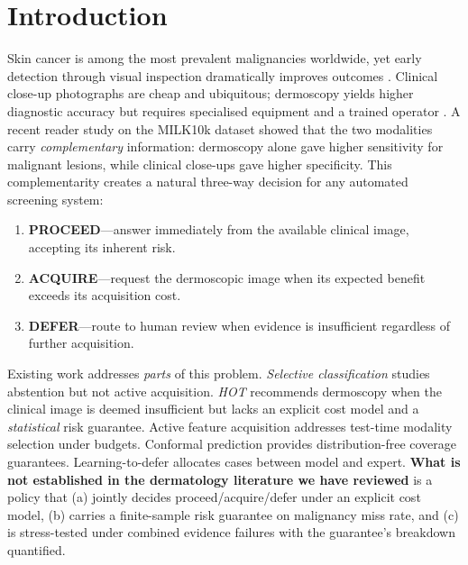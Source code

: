 \documentclass[conference]{IEEEtran}
\newcommand{\1}{\mathbf{1}}
\begin{document}
\section{Introduction}
\label{sec:introduction}

Skin cancer is among the most prevalent malignancies worldwide, yet early
detection through visual inspection dramatically improves outcomes
\cite{tschandl2018ham10000}. Clinical close-up photographs are cheap and
ubiquitous; dermoscopy yields higher diagnostic accuracy but requires
specialised equipment and a trained operator \cite{muller2026complementary}.
A recent reader study on the MILK10k dataset \cite{tschandl2024milk10k}
showed that the two modalities carry \emph{complementary} information:
dermoscopy alone gave higher sensitivity for malignant lesions, while
clinical close-ups gave higher specificity. This complementarity creates a
natural three-way decision for any automated screening system:

\begin{enumerate}[leftmargin=*, label=(\arabic*)]
  \item \textbf{PROCEED}---answer immediately from the available clinical
        image, accepting its inherent risk.
  \item \textbf{ACQUIRE}---request the dermoscopic image when its expected
        benefit exceeds its acquisition cost.
  \item \textbf{DEFER}---route to human review when evidence is
        insufficient regardless of further acquisition.
\end{enumerate}

Existing work addresses \emph{parts} of this problem.
\textit{Selective classification} \cite{geifman2017selective} studies
abstention but not active acquisition. \textit{HOT} \cite{mehta2023hot}
recommends dermoscopy when the clinical image is deemed insufficient but
lacks an explicit cost model and a \emph{statistical} risk guarantee.
Active feature acquisition \cite{shim2018joint,valancius2023aco,rheude2025cama}
addresses test-time modality selection under budgets. Conformal prediction
\cite{angelopoulos2021gentle,angelopoulos2020raps} provides distribution-free
coverage guarantees. Learning-to-defer \cite{mozannar2020defer} allocates
cases between model and expert. \textbf{What is not established in the
dermatology literature we have reviewed} is a policy that (a) jointly decides
proceed/acquire/defer under an explicit cost model, (b) carries a
finite-sample risk guarantee on malignancy miss rate, and (c) is stress-tested
under combined evidence failures with the guarantee's breakdown quantified.
\end{document}
